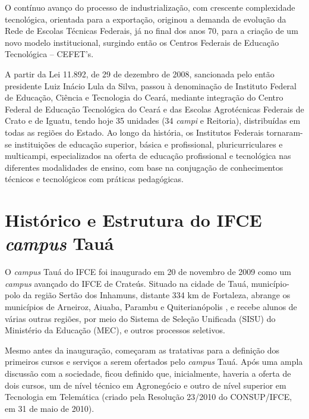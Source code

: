 O contínuo avanço do processo de industrialização, com crescente complexidade tecnológica, orientada para a exportação, originou a demanda de evolução da Rede de Escolas Técnicas Federais, já no final dos anos 70, para a criação de um novo modelo institucional, surgindo então os Centros Federais de Educação Tecnológica – CEFET's.


A partir da Lei 11.892, de 29 de dezembro de 2008, sancionada pelo então
presidente Luiz Inácio Lula da Silva, passou \`a denominação de Instituto
Federal de Educação, Ciência e Tecnologia do Ceará, mediante integração do
Centro Federal de Educação Tecnológica do Ceará e das Escolas Agrotécnicas
Federais de Crato e de Iguatu, tendo hoje 35 unidades (34 \textit{campi} e Reitoria), distribuídas em todas as
regiões do Estado.
Ao longo da história, os Institutos Federais tornaram-se instituições de
educação superior, básica e profissional, pluricurriculares e multicampi,
especializados na oferta de educação profissional e tecnológica nas diferentes
modalidades de ensino, com base na conjugação de conhecimentos técnicos e
tecnológicos com práticas pedagógicas.



\section{Histórico e Estrutura do IFCE \textit{campus} Tauá}

O \textit{campus} Tauá do IFCE foi inaugurado em 20 de novembro de 2009 como um \textit{campus} avançado do IFCE de Crateús. Situado na cidade de Tauá, município-polo da região Sertão dos Inhamuns, distante 334 $\mathrm{km}$ de Fortaleza, abrange os municípios de Arneiroz, Aiuaba, Parambu e Quiterianópolis \cite{ipece17}, e recebe alunos de várias outras regiões, por meio do Sistema de Seleção Unificada (SISU) do Ministério da Educação (MEC), e outros processos seletivos.

Mesmo antes da inauguração, começaram as tratativas para a definição dos primeiros cursos e serviços a serem ofertados pelo \textit{campus} Tauá. Após uma ampla discussão com a sociedade, ficou definido que, inicialmente, haveria a oferta de dois cursos, um de nível técnico em Agronegócio e outro de nível superior em Tecnologia em Telemática (criado pela Resolução 23/2010 do CONSUP/IFCE, em 31 de maio de 2010).

